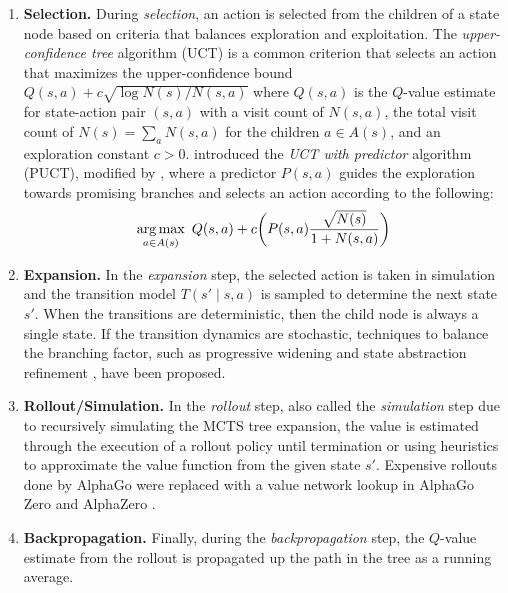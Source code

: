 \begin{enumerate}
    \item \textbf{Selection.}\quad 
    During \textit{selection}, an action is selected from the children of a state node based on criteria that balances exploration and exploitation.
    The \textit{upper-confidence tree} algorithm (UCT) \cite{kocsis2006bandit} is a common criterion that selects an action that maximizes the upper-confidence bound $Q(s, a) + c\sqrt{\log N(s)/N(s,a)}$ 
    where $Q(s,a)$ is the $Q$-value estimate for state-action pair $(s,a)$ with a visit count of $N(s,a)$, the total visit count of $N(s) = \sum_a N(s,a)$ for the children ${a \in A(s)}$, and an exploration constant $c > 0$.
    \textcite{rosin2011multi} introduced the \textit{UCT with predictor} algorithm (PUCT), modified by \textcite{silver2017mastering}, where a predictor $P(s,a)$ guides the exploration towards promising branches and selects an action according to the following:
    \begin{equation}
        \argmax_{a \in A(s)}\ Q(s,a) + c\bigg(P(s,a)\frac{\sqrt{N(s)}}{1 + N(s,a)}\bigg) \label{eq:puct}
    \end{equation}
    
    \item \textbf{Expansion.}\quad 
    In the \textit{expansion} step, the selected action is taken in simulation and the transition model $T(s' \mid s, a)$ is sampled to determine the next state $s'$.
    When the transitions are deterministic, then the child node is always a single state.
    If the transition dynamics are stochastic, techniques to balance the branching factor, such as progressive widening \cite{couetoux2011continuous} and state abstraction refinement \cite{sokota2021monte}, have been proposed.
    
    \item \textbf{Rollout/Simulation.}\quad 
    In the \textit{rollout} step, also called the \textit{simulation} step due to recursively simulating the MCTS tree expansion, the value is estimated through the execution of a rollout policy until termination or using heuristics to approximate the value function from the given state $s'$.
    Expensive rollouts done by AlphaGo \cite{silver2016mastering} were replaced with a value network lookup in AlphaGo Zero and AlphaZero \cite{silver2017mastering,silver2018general}.
    
    \item \textbf{Backpropagation.}\quad 
    Finally, during the \textit{backpropagation} step, the $Q$-value estimate from the rollout is propagated up the path in the tree as a running average.
\end{enumerate}


